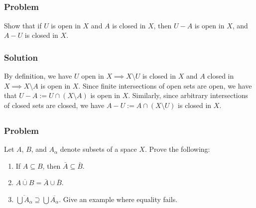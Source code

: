
\subsection{}

\subsubsection{Problem}
Show that if $U$ is open in $X$ and $A$ is closed in $X$, then $U-A$ is open in $X$, and $A-U$ is closed in $X$.
\subsubsection{Solution}
By definition, we have $U$ open in $X \implies X\setminus U$ is closed in $X$ and $A$ closed in $X \implies X\setminus A$ is open in $X$. Since finite intersections of open sets are open, we have that $U-A := U \cap (X\setminus A)$ is open in $X$. Similarly, since arbitrary intersections of closed sets are closed, we have $A-U := A \cap (X\setminus U)$ is closed in $X$.


\setcounter{subsection}{5} %
\subsection{}

\subsubsection{Problem}
Let $A$, $B$, and $A_\alpha$ denote subsets of a space $X$. Prove the following:
\begin{enumerate}
 \item If $A \subseteq B$, then $\bar{A} \subseteq \bar{B}$.
 \item $\overline{A \cup B} = \bar A \cup \bar B$.
 \item $\overline{\bigcup A_\alpha} \supseteq \bigcup \overline{A_\alpha}$. Give an example where equality fails.
\end{enumerate}
